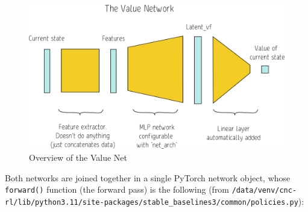 \documentclass[
  letterpaper,
  DIV=11,
  numbers=noendperiod]{scrartcl}
\begin{document}
\begin{figure}

{\centering \includegraphics{img/ValueNet.png}

}

\caption{Overview of the Value Net}

\end{figure}

Both networks are joined together in a single PyTorch network object,
whose \texttt{forward()} function (the forward pass) is the following
(from
\texttt{/data/venv/cnc-rl/lib/python3.11/site-packages/stable\_baselines3/common/policies.py}):
\end{document}
